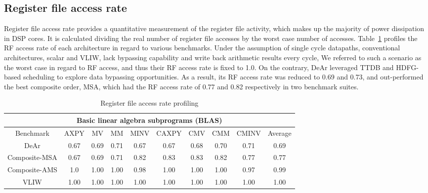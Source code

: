 {    \subsection{Register file access rate}
    Register file access rate provides a quantitative measurement of the register file activity, 
    which makes up the majority of power dissipation in DSP cores.
    It is calculated dividing the real number of register file accesses by the worst case number of accesses.
    Table~\ref{tab:rpd} profiles the RF access rate of each architecture in regard to various benchmarks.
    Under the assumption of single cycle datapaths, conventional architectures, scalar and VLIW, 
    lack bypassing capability and write back arithmetic results every cycle, 
    We referred to such a scenario as the worst case in regard to RF access, 
    and thus their RF access rate is fixed to 1.0.
    On the contrary, DeAr leveraged TTDB and HDFG-based scheduling to explore data bypassing opportunities. 
    As a result, its RF access rate was reduced to 0.69 and 0.73, 
    and out-performed the best composite order, MSA, which had the RF access rate of 0.77 and 0.82 respectively in two benchmark suites.
    \begin{table}[!ht]
        \centering
        \caption{Register file access rate profiling}
        \label{tab:rpd}
        \resizebox{\columnwidth}{!}
        {
            \begin{tabular}{|c|c|c|c|c|c|c|c|c|c|}
                \hline
                \multicolumn{10}{|c|}{\textbf{Basic linear algebra subprograms (BLAS)}} \\ \hline
                Benchmark  &  AXPY  &  MV  &  MM  &  MINV  &  CAXPY  &  CMV  &  CMM  &  CMINV  &  Average \\ \hline 
                DeAr  &   0.67  &   0.69  &   0.71  &   0.67  &   0.67  &   0.68  &   0.70  &   0.71  &   0.69     \\ \hline
                Composite-MSA  &   0.67  &   0.69  &  0.71  &   0.82  &   0.83  &   0.83  &   0.82  &   0.77  &  0.77     \\ \hline 
                Composite-AMS  &   1.0  &   1.00  &   1.00  &   0.98  &   1.00  &   1.00  &   1.00  &   0.97  &   0.99     \\ \hline 
                VLIW  &   1.00  &   1.00  &   1.00  &   1.00  &   1.00  &   1.00  &   1.00  &   1.00  &   1.00     \\ \hline 

\end{tabular}}
\end{table}}
